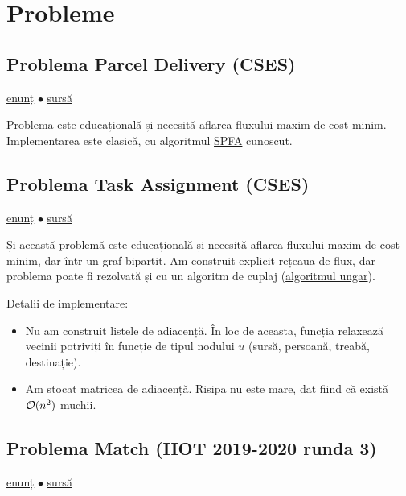 \documentclass[../main.tex]{subfiles}
\begin{document}
\section{Probleme}

\subsection{Problema Parcel Delivery (CSES)}
\label{problem:parcel-delivery}

\href{https://cses.fi/problemset/task/2121}{enunț}
$\bullet$
\hyperref[code:parcel-delivery]{sursă}

Problema este educațională și necesită aflarea fluxului maxim de cost minim. Implementarea este clasică, cu algoritmul \hyperref[sec:bellman-ford]{SPFA} cunoscut.


\subsection{Problema Task Assignment (CSES)}
\label{problem:task-assignment}

\href{https://cses.fi/problemset/task/2129}{enunț}
$\bullet$
\hyperref[code:task-assignment]{sursă}

Și această problemă este educațională și necesită aflarea fluxului maxim de cost minim, dar într-un graf bipartit. Am construit explicit rețeaua de flux, dar problema poate fi rezolvată și cu un algoritm de cuplaj (\href{https://cp-algorithms.com/graph/hungarian-algorithm.html}{algoritmul ungar}).

Detalii de implementare:

\begin{itemize}
  \item Nu am construit listele de adiacență. În loc de aceasta, funcția  relaxează vecinii potriviți în funcție de tipul nodului $u$ (sursă, persoană, treabă, destinație).
  \item Am stocat matricea de adiacență. Risipa nu este mare, dat fiind că există $\mathcal{O}(n^2)$ muchii.
\end{itemize}


\subsection{Problema Match (IIOT 2019-2020 runda 3)}
\label{problem:match}

\href{https://kilonova.ro/problems/1991}{enunț}
$\bullet$
\hyperref[code:match]{sursă}
\end{document}
